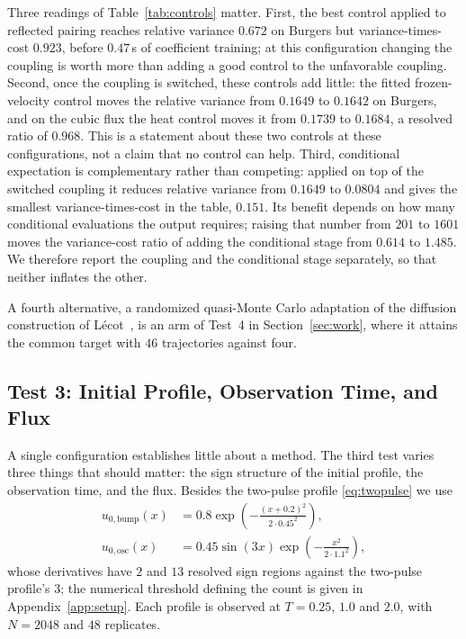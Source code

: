\documentclass[smallextended,nospthms]{svjour3}
\theoremstyle{plain}
\theoremstyle{definition}
\theoremstyle{remark}
\numberwithin{equation}{section}
\begin{document}
Three readings of Table~\ref{tab:controls} matter. First, the best control
applied to reflected pairing reaches relative variance $0.672$ on Burgers but
variance-times-cost $0.923$, before $0.47$\,s of coefficient training; at this
configuration changing the coupling is worth more than adding a good control to
the unfavorable coupling. Second, once the coupling is switched, these
controls add little: the fitted frozen-velocity control moves the relative
variance from $0.1649$ to $0.1642$ on Burgers, and on the cubic flux the heat
control moves it from $0.1739$ to $0.1684$, a resolved ratio of $0.968$. This
is a statement about these two controls at these configurations, not a claim
that no control can help. Third, conditional expectation is complementary
rather than competing: applied on top of the switched coupling it reduces
relative variance from $0.1649$ to $0.0804$ and gives the smallest
variance-times-cost in the table, $0.151$. Its benefit depends on how many
conditional evaluations the output requires; raising that number from $201$ to
$1601$ moves the variance-cost ratio of adding the conditional stage from
$0.614$ to $1.485$. We therefore report the coupling and the conditional stage
separately, so that neither inflates the other.

A fourth alternative, a randomized quasi-Monte Carlo adaptation of the
diffusion construction of Lécot~\citep{lecot_rims2001}, is an arm of
Test~4 in Section~\ref{sec:work}, where it attains the common target with
$46$ trajectories against four.

\subsection{Test 3: Initial Profile, Observation Time, and Flux}
\label{sec:profiles}

A single configuration establishes little about a method. The third test varies
three things that should matter: the sign structure of the initial profile, the
observation time, and the flux. Besides the two-pulse profile
\eqref{eq:twopulse} we use
\begin{equation}
 \begin{aligned}
 u_{0,\mathrm{bump}}(x)&=0.8\exp\!\left(-\frac{(x+0.2)^2}{2\cdot0.45^2}\right),\\
 u_{0,\mathrm{osc}}(x)&=0.45\sin(3x)\exp\!\left(-\frac{x^2}{2\cdot1.1^2}\right),
 \end{aligned}
 \label{eq:profiles}
\end{equation}
whose derivatives have $2$ and $13$ resolved sign regions against the
two-pulse profile's $3$; the numerical threshold defining the count is given in
Appendix~\ref{app:setup}. Each profile is observed at $T=0.25$, $1.0$ and
$2.0$, with $N=2048$ and $48$ replicates.
\end{document}

